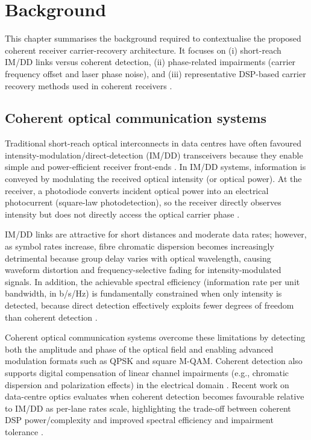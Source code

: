 \chapter{Background}\label{Background}
This chapter summarises the background required to contextualise the proposed coherent
receiver carrier-recovery architecture. It focuses on (i) short-reach IM/DD links versus
coherent detection, (ii) phase-related impairments (carrier frequency offset and laser
phase noise), and (iii) representative DSP-based carrier recovery methods used in coherent
receivers \cite{Savory2010JSTQE,Kuschnerov2009JLT}.

\section{Coherent optical communication systems}
Traditional short-reach optical interconnects in data centres have often favoured
intensity-modulation/direct-detection (IM/DD) transceivers because they enable simple and
power-efficient receiver front-ends \cite{Wartak2013OpticalReceivers}. In IM/DD systems,
information is conveyed by modulating the received optical intensity (or optical power).
At the receiver, a photodiode converts incident optical power into an electrical
photocurrent (square-law photodetection), so the receiver directly observes intensity but
does not directly access the optical carrier phase \cite{Wartak2013OpticalReceivers,KahnHo2004JSTQE}.

IM/DD links are attractive for short distances and moderate data rates; however, as symbol
rates increase, fibre chromatic dispersion becomes increasingly detrimental because group
delay varies with optical wavelength, causing waveform distortion and frequency-selective
fading for intensity-modulated signals. In addition, the achievable spectral efficiency
(information rate per unit bandwidth, in b/s/Hz) is fundamentally constrained when only
intensity is detected, because direct detection effectively exploits fewer degrees of
freedom than coherent detection \cite{KahnHo2004JSTQE}.
 
Coherent optical communication systems overcome these limitations by detecting both the
amplitude and phase of the optical field and enabling advanced modulation formats such as
QPSK and square M-QAM. Coherent detection also supports digital compensation of linear
channel impairments (e.g., chromatic dispersion and polarization effects) in the electrical
domain \cite{KahnHo2004JSTQE,Savory2010JSTQE,Kuschnerov2009JLT}. Recent work on data-centre
optics evaluates when coherent detection becomes favourable relative to IM/DD as per-lane
rates scale, highlighting the trade-off between coherent DSP power/complexity and improved
spectral efficiency and impairment tolerance \cite{Zhou2020JLT}.

